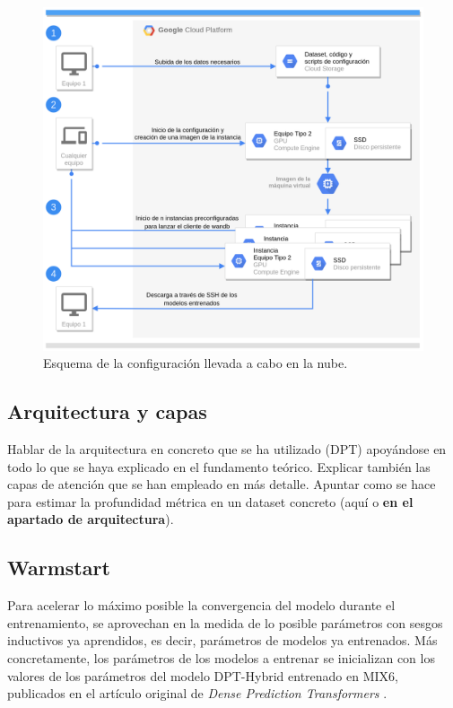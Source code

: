 \begin{figure}[H]
\centering
\includegraphics[width=\textwidth]{imagenes/cloud-diagram.png}
\caption{Esquema de la configuración llevada a cabo en la nube.}
\label{fig:cloud-diagram}
\end{figure}

\subsection{Arquitectura y capas}
Hablar de la arquitectura en concreto que se ha utilizado (DPT) apoyándose en todo lo que se haya explicado en el fundamento teórico. Explicar también las capas de atención que se han empleado en más detalle.
Apuntar como se hace para estimar la profundidad métrica en un dataset concreto (aquí o \textbf{en el apartado de arquitectura}).

\subsection{Warmstart}
Para acelerar lo máximo posible la convergencia del modelo durante el entrenamiento, se aprovechan en la medida de lo posible parámetros con sesgos inductivos ya aprendidos, es decir, parámetros de modelos ya entrenados. Más concretamente, los parámetros de los modelos a entrenar se inicializan con los valores de los parámetros del modelo DPT-Hybrid entrenado en MIX6, publicados en el artículo original de \textit{Dense Prediction Transformers} \cite{visiontransformersDPT}. 

